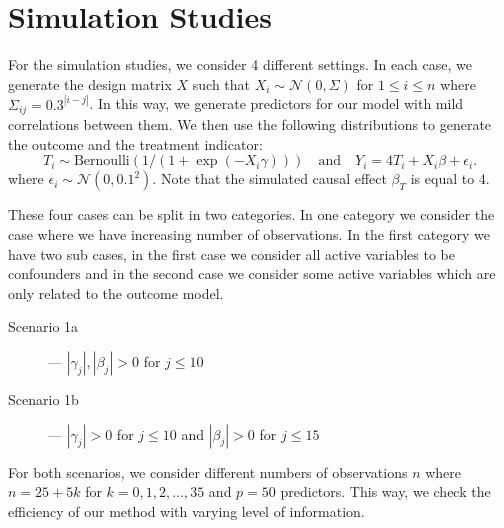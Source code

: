 \documentclass[preprint,12pt]{elsarticle}
\begin{document}

\section{Simulation Studies}\label{sec:sim}

For the simulation studies, we consider 4 different settings. In each
case, we generate the design matrix $X$ such that $X_i\sim\mathcal{N}(0, \Sigma)$
for $1\le i\le n$ where $\Sigma_{ij} = 0.3^{|i-j|}$. In this way, we 
generate predictors for our model with mild correlations between them.
We then use the following distributions to generate the outcome and
the treatment indicator: 
\begin{equation}
    T_i \sim \text{Bernoulli}\left(1/(1+\exp(-X_i\gamma))\right)
    \quad\text{and}\quad
    Y_i = 4T_i + X_i\beta + \epsilon_i.
\end{equation}
where $\epsilon_i\sim\mathcal{N}(0,0.1^2)$.
Note that the simulated causal effect $\beta_T$ is equal to $4$.

These four cases can be split in two categories. In one category we consider the
case where we have increasing number of observations. In the first category we have two
sub cases, in the first case we consider all active variables to be confounders
and in the second case we consider some active variables which are only related to
the outcome model. 
\begin{description}
    \item[Scenario 1a] --- $|\gamma_j|, |\beta_j|>0$ for $j\le 10$
    \item[Scenario 1b] --- $|\gamma_j|>0$ for $j\le 10$ and $|\beta_j|>0$ for $j\le 15$
\end{description}
For both
scenarios, we consider different numbers of observations $n$ where
$n=25+ 5k$ for $k=0,1,2,\dots,35$ and $p=50$
predictors. This way, we check the efficiency of our method with varying level of information.
\end{document}

